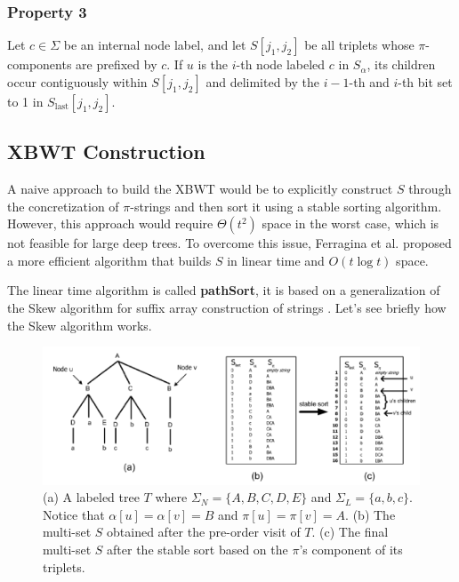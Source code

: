 \subsubsection{Property 3} \label{prop3}
Let $c \in \Sigma$ be an internal node label, and let $S[j_1, j_2]$ be all triplets whose $\pi$-components are prefixed by $c$. If $u$ is the $i$-th node labeled $c$ in $S_{\alpha}$, its children occur contiguously within $S[j_1, j_2]$ and delimited by the $i - 1$-th and $i$-th bit set to 1 in $S_{\text{last}}[j_1, j_2]$.

\subsection{XBWT Construction}
A naive approach to build the XBWT would be to explicitly construct $S$ through the concretization of $\pi$-strings and then sort it using a stable sorting algorithm. However, this approach would require $\Theta(t^2)$ space in the worst case, which is not feasible for large deep trees. To overcome this issue, Ferragina et al. \cite{ferragina2009compressing} proposed a more efficient algorithm that builds $S$ in linear time and $O(t \log t)$ space.

The linear time algorithm is called \textbf{pathSort}, it is based on a generalization of the Skew algorithm for suffix array construction of strings \cite{karkkainen2006linear}. Let's see briefly how the Skew algorithm works.

\begin{figure}
    \centering
    \includegraphics[width=1\textwidth]{Immagini/XBWT_example.png}
    \caption[XBWT example]{(a) A labeled tree $T$ where $\Sigma_N = \{A, B, C, D, E\}$ and $\Sigma_L = \{a, b, c\}$. Notice that $\alpha[u] = \alpha[v] = B$ and $\pi[u] = \pi[v] = A$. (b) The multi-set $S$ obtained after the pre-order visit of $T$. (c) The final multi-set $S$ after the stable sort based on the $\pi$'s component of its triplets.}
    \label{fig:XBWT_example}
\end{figure}

